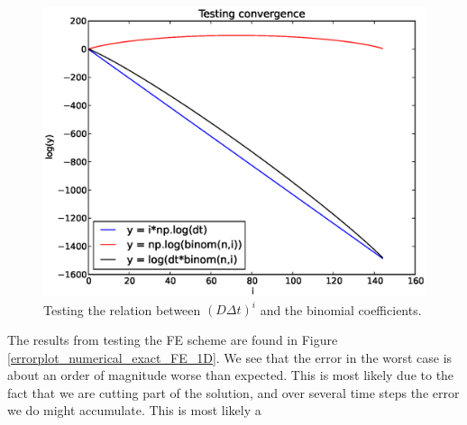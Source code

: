 \begin{figure}[H]
 \centering
 \includegraphics[scale=0.7]{Figures/convergence_exact_numerical_1d_n145}
 \caption{Testing the relation between $\left(D\Delta t\right)^i$ and the binomial coefficients.}
 \label{convergence_exact_numerical_1d_n145}
\end{figure}
The results from testing the FE scheme are found in Figure \ref{errorplot_numerical_exact_FE_1D}. We see that the error in the worst case is about an order of magnitude worse than expected. This is most likely due to the fact that we are cutting part of the solution, and over several time steps the error we do might accumulate.
This is most likely a 

